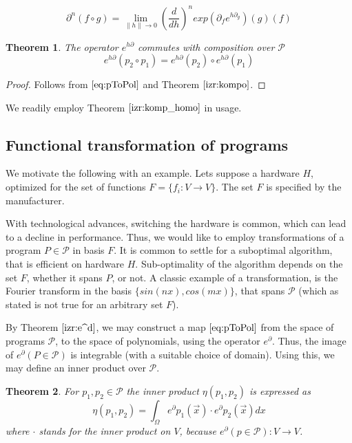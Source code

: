\documentclass{article}
\newcommand{\dP}{\mathcal{P}}
\newcommand{\D}{\partial}
\newtheorem{izrek}{Theorem}[section]
\begin{document}
 \begin{equation}\label{eq:dkompo}
 \D^n(f\circ g)=\lim\limits_{\lVert h\rVert\to 0}(\frac{d}{dh})^nexp(\D_fe^{h\D_g})(g)(f)
 \end{equation}
 
   \begin{izrek}\label{izr:komp_homo}
   The operator $e^{h\D}$ commutes with composition over $\dP$
   \begin{equation}
   e^{h\D}(p_2\circ p_1)=e^{h\D}(p_2)\circ e^{h\D}(p_1)
   \end{equation}
   \end{izrek}
   
   \begin{proof}
   Follows from $\eqref{eq:pToPol}$ and Theorem $\ref{izr:kompo}$.
   \end{proof}
 We readily employ Theorem $\ref{izr:komp_homo}$ in usage.
 
   \subsection{Functional transformation of programs}\label{sec:FTP}
   
   We motivate the following with an example. Lets suppose a hardware $H$, optimized for the set of functions $F=\{f_i:V\to V\}$. The set $F$ is specified by the manufacturer.
   
   With technological advances, switching the hardware is common, which can lead to a decline in performance. Thus, we would like to employ transformations of a program $P\in\dP$ in basis $F$. It is common to settle for a suboptimal algorithm, that is efficient on hardware $H$. Sub-optimality of the algorithm depends on the set $F$, whether it spans $P$, or not. A classic example of a transformation, is the Fourier transform in the basis $\{sin(nx), cos(mx)\}$, that spans $\dP$ (which as stated is not true for an arbitrary set $F$).
   
   By Theorem $\ref{izr:e^d}$, we may construct a map $\eqref{eq:pToPol}$ from the space of programs $\dP$, to the space of polynomials, using the operator $e^\D$. Thus, the image of $e^\D(P\in\dP)$ is integrable (with a suitable choice of domain). Using this, we may define an inner product over $\dP$.
   
  \begin{izrek}
  For $p_1,p_2\in\dP$ the inner product $\eta(p_1,p_2)$ is expressed as
  \begin{equation}
  	\eta(p_1,p_2)=\int_{\Omega}e^\D p_1(\vec{x})\cdot e^\D p_2(\vec{x})dx
  \end{equation}
  where $\cdot$ stands for the inner product on $V$, because $e^\D(p\in\dP):V\to V$.
  \end{izrek}
  
\end{document}
